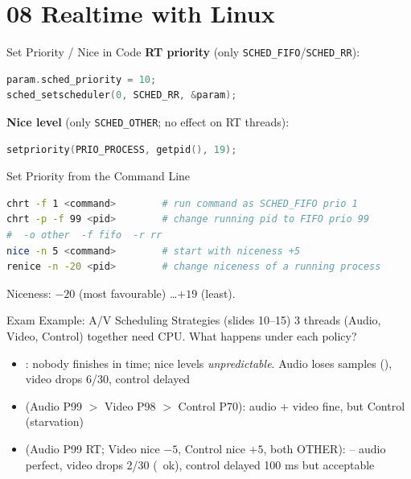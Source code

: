 \section{08 Realtime with Linux}

\begin{KR}{Set Priority / Nice in Code}
    \textbf{RT priority} (only \texttt{SCHED\_FIFO}/\texttt{SCHED\_RR}):
\begin{lstlisting}[language=C, style=basesmol, aboveskip=2pt, belowskip=2pt]
param.sched_priority = 10;
sched_setscheduler(0, SCHED_RR, &param);
\end{lstlisting}
    \textbf{Nice level} (only \texttt{SCHED\_OTHER}; no effect on RT threads):
\begin{lstlisting}[language=C, style=basesmol, aboveskip=2pt, belowskip=2pt]
setpriority(PRIO_PROCESS, getpid(), 19);
\end{lstlisting}
\end{KR}

\begin{KR}{Set Priority from the Command Line}
\begin{lstlisting}[language=bash, style=basesmol, aboveskip=2pt, belowskip=2pt]
chrt -f 1 <command>        # run command as SCHED_FIFO prio 1
chrt -p -f 99 <pid>        # change running pid to FIFO prio 99
#  -o other  -f fifo  -r rr
nice -n 5 <command>        # start with niceness +5
renice -n -20 <pid>        # change niceness of a running process
\end{lstlisting}
    Niceness: $-20$ (most favourable) \dots $+19$ (least).
\end{KR}

\begin{example2}{Exam Example: A/V Scheduling Strategies (slides 10--15)}
    3 threads (Audio, Video, Control) together need  CPU. What
    happens under each policy?
    \tcblower
    \begin{itemize}
        \item {}: nobody finishes in time; nice
              levels \emph{unpredictable}. Audio loses samples (), video drops 6/30, control delayed
        \item {} (Audio P99 $>$ Video P98 $>$
              Control P70): audio + video fine, but Control 
              (starvation)
        \item {} (Audio P99 RT; Video nice $-5$, Control nice $+5$,
              both OTHER):  -- audio perfect, video
              drops 2/30 (~ok), control delayed 100 ms but acceptable
    \end{itemize}
\end{example2}


